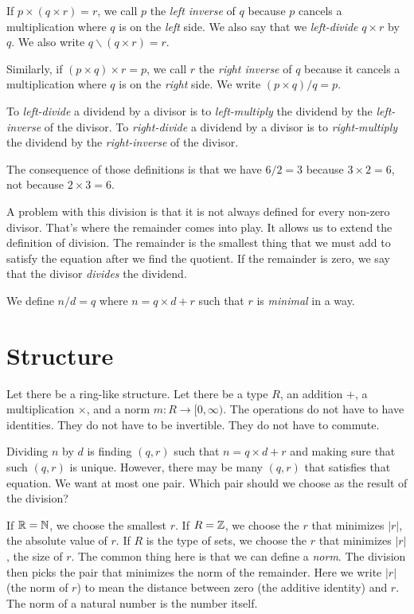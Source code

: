 If \(p \times (q \times r) = r\), we call \(p\)
the \emph{left inverse} of \(q\) because \(p\)
cancels a multiplication where \(q\) is on the \emph{left} side.
We also say that we \emph{left-divide} \(q \times r\) by \(q\).
We also write \(q \backslash (q \times r) = r\).

Similarly, if \((p \times q) \times r = p\), we call \(r\)
the \emph{right inverse} of \(q\) because it
cancels a multiplication where \(q\) is on the \emph{right} side.
We write \((p \times q) / q = p\).

To \emph{left-divide} a dividend by a divisor is
to \emph{left-multiply} the dividend by the \emph{left-inverse} of the divisor.
To \emph{right-divide} a dividend by a divisor is
to \emph{right-multiply} the dividend by the \emph{right-inverse} of the divisor.

The consequence of those definitions is that
we have \(6 / 2 = 3\)
because \(3 \times 2 = 6\),
not because \(2 \times 3 = 6\).

A problem with this division is that
it is not always defined for every non-zero divisor.
That's where the remainder comes into play.
It allows us to extend the definition of division.
The remainder is the smallest thing that we must add to satisfy the equation
after we find the quotient.
If the remainder is zero, we say that the divisor \emph{divides} the dividend.

We define \(n/d = q\) where \(n = q \times d + r\)
such that \(r\) is \emph{minimal} in a way.

\section{Structure}

Let there be a ring-like structure.
Let there be a type \(R\),
an addition \(+\),
a multiplication \(\times\),
and a norm \(m : R \to [ 0,\infty )\).
The operations do not have to have identities.
They do not have to be invertible.
They do not have to commute.

Dividing \(n\) by \(d\) is finding \((q,r)\) such that \(n = q \times d + r\)
and making sure that such \((q,r)\) is unique.
However, there may be many \((q,r)\) that satisfies that equation.
We want at most one pair.
Which pair should we choose as the result of the division?

If \(\mathbb{R} = \mathbb{N}\), we choose the smallest \(r\).
If \(R = \mathbb{Z}\), we choose the \(r\) that minimizes \(|r|\),
the absolute value of \(r\).
If \(R\) is the type of sets, we choose the \(r\)
that minimizes \(|r|\), the size of \(r\).
The common thing here is that we can define a \emph{norm}.
The division then picks the pair that minimizes the norm of the remainder.
Here we write \(|r|\) (the norm of \(r\))
to mean the distance between zero (the additive identity) and \(r\).
The norm of a natural number is the number itself.


